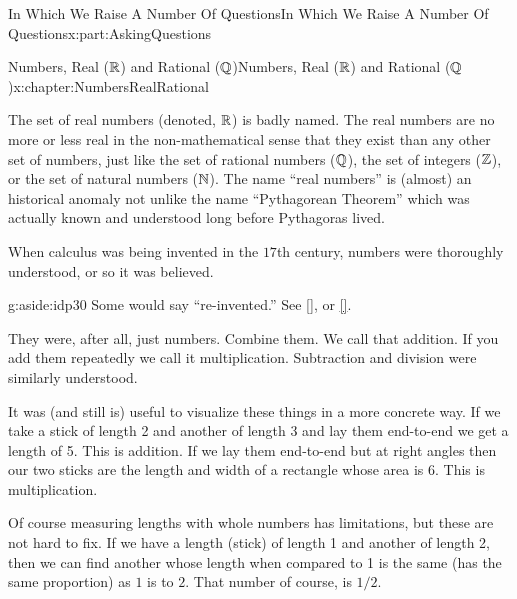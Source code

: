 
\typeout{************************************************}
\typeout{************************************************}
%
\begin{partptx}{In Which We Raise A Number Of Questions}{}{In Which We Raise A Number Of Questions}{}{}{x:part:AskingQuestions}
	\typeout{************************************************}
	\typeout{************************************************}
	\begin{chapterptx}{Numbers, Real (\(\mathbb {R}\)) and Rational (\(\mathbb {Q}\))}{}{Numbers, Real (\(\mathbb {R}\)) and Rational (\(\mathbb {Q}\))}{}{}{x:chapter:NumbersRealRational}
		\begin{introduction}{}%
			The set of real numbers (denoted, \(\mathbb {R}\)) is badly named. The real numbers are no more or less real \textemdash{} in the non-mathematical sense that they exist \textemdash{} than any other set of numbers, just like the set of rational numbers (\(\mathbb {Q}\)), the set of integers (\(\mathbb {Z}\)), or the set of natural numbers (\(\mathbb {N}\)). The name ``real numbers'' is (almost) an historical anomaly not unlike the name ``Pythagorean Theorem'' which was actually known and understood long before Pythagoras lived.%
			\par
			When calculus was being invented in the \(17\)th century, numbers were thoroughly understood, or so it was believed.%
			\begin{aside}{}{g:aside:idp30}%
				Some would say ``re-invented.'' See \hyperlink{x:biblio:russo96__forgot_revol}{[{}]}, or \hyperlink{x:biblio:netz07__archim_codex}{[{}]}.  %
			\end{aside}
			They were, after all, just numbers. Combine them. We call that addition. If you add them repeatedly we call it multiplication. Subtraction and division were similarly understood.%
			\par
			It was (and still is) useful to visualize these things in a more concrete way. If we take a stick of length 2 and another of length 3 and lay them end-to-end we get a length of 5. This is addition. If we lay them end-to-end but at right angles then our two sticks are the length and width of a rectangle whose area is 6. This is multiplication.%
			\par
			Of course measuring lengths with whole numbers has limitations, but these are not hard to fix. If we have a length (stick) of length 1 and another of length 2, then we can find another whose length when compared to 1 is the same (has the same proportion) as \(1\) is to \(2\). That number of course, is \(1/2\).%

\end{introduction}
\end{chapterptx}
\end{partptx}
